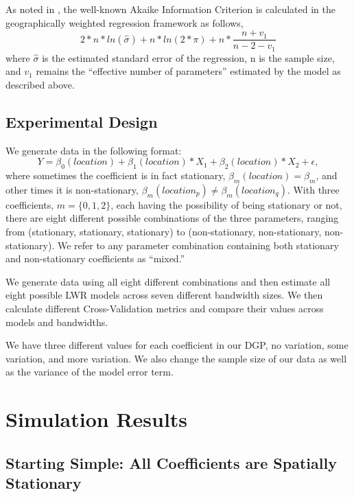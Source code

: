 \documentclass{article}\usepackage[]{graphicx}\usepackage[]{color}
\begin{document}
As noted in \citep{Fotheringham2002}, the well-known Akaike Information Criterion is calculated in the geographically weighted regression framework as follows,
\begin{equation}\label{eq:AIC}
  2*n*ln(\hat{\sigma}) + n*ln(2*\pi) + 
    n*\frac{n + v_1}{n - 2 - v_1}
    \end{equation}
where $\hat{\sigma}$ is the estimated standard error of the regression, n is the sample size, and $v_1$ remains the ``effective number of parameters'' estimated by the model as described above.

\subsection{Experimental Design}

We generate data in the following format:
\begin{equation}
Y = \beta _0(location) + \beta _1(location) *X_1 + \beta _2(location) * X_2 + \epsilon ,
\end{equation}
where sometimes the coefficient is in fact stationary, $\beta _m(location) = \beta _m$, and other times it is non-stationary, $\beta _m (location_p) \neq \beta _m (location_q)$. With three coefficients, $m = \{0, 1, 2\}$, each having the possibility of being stationary or not, there are eight different possible combinations of the three parameters, ranging from (stationary, stationary, stationary) to (non-stationary, non-stationary, non-stationary). We refer to any parameter combination containing both stationary and non-stationary coefficients as ``mixed.''

We generate data using all eight different combinations and then estimate all eight possible LWR models across seven different bandwidth sizes. We then calculate different Cross-Validation metrics and compare their values across models and bandwidths. 

We have three different values for each coefficient in our DGP, no variation, some variation, and more variation. We also change the sample size of our data as well as the variance of the model error term.

\section{Simulation Results}

\subsection{Starting Simple: All Coefficients are Spatially Stationary}
\end{document}
